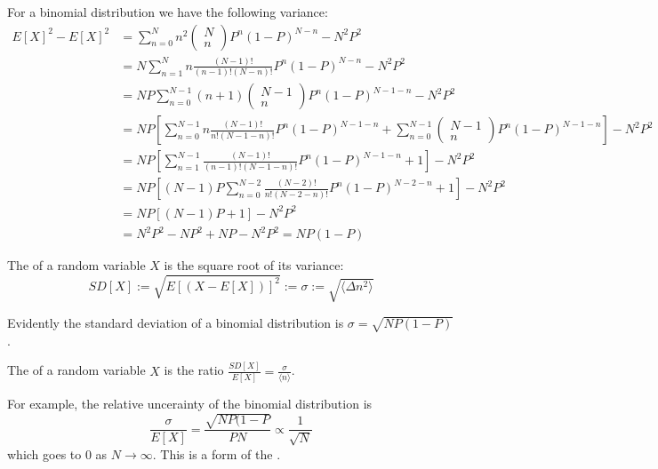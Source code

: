 \documentclass[12pt, a4paper, oneside, openright, titlepage]{book}
\begin{document}
For a binomial distribution we have the following variance: 
\begin{align*}
    E[X]^2 - E[X]^2 &= \sum_{n=0}^Nn^2\begin{pmatrix} N \\ n\end{pmatrix} P^n(1-P)^{N-n} - N^2P^2 \\
    &= N\sum_{n=1}^Nn\frac{(N-1)!}{(n-1)!(N-n)!}P^n(1-P)^{N-n} - N^2P^2 \\
    &= NP\sum_{n=0}^{N-1}(n+1)\begin{pmatrix} N-1 \\ n\end{pmatrix} P^{n}(1-P)^{N-1-n} -N^2P^2 \\
    &= NP\left[\sum_{n=0}^{N-1}n\frac{(N-1)!}{n!(N-1-n)!}P^n(1-P)^{N-1-n} + \sum_{n=0}^{N-1}\begin{pmatrix} N-1 \\ n\end{pmatrix} P^{n}(1-P)^{N-1-n}\right] - N^2P^2 \\
    &= NP\left[\sum_{n=1}^{N-1}\frac{(N-1)!}{(n-1)!(N-1-n)!}P^n(1-P)^{N-1-n} + 1\right] - N^2P^2 \\
    &= NP\left[(N-1)P\sum_{n=0}^{N-2}\frac{(N-2)!}{n!(N-2-n)!}P^n(1-P)^{N-2-n}+1\right] - N^2P^2 \\
    &= NP\left[(N-1)P+1\right] -N^2P^2 \\
    &= N^2P^2 - NP^2+NP - N^2P^2 = NP(1-P)
\end{align*}

\begin{defn}
    The  of a random variable $X$ is the square root of its variance: \begin{equation*}
        SD[X] := \sqrt{E[(X-E[X])]^2} := \sigma := \sqrt{\langle \Delta n^2\rangle}
    \end{equation*}
\end{defn}

Evidently the standard deviation of a binomial distribution is $\sigma = \sqrt{NP(1-P)}$.

\begin{defn}
    The  of a random variable $X$ is the ratio $\frac{SD[X]}{E[X]} = \frac{\sigma}{\langle n \rangle}$.
\end{defn}


For example, the relative uncerainty of the binomial distribution is \begin{equation*}
    \frac{\sigma}{E[X]} = \frac{\sqrt{NP(1-P}}{PN} \propto \frac{1}{\sqrt{N}}
\end{equation*}
which goes to $0$ as $N\rightarrow \infty$. This is a form of the .
\end{document}
